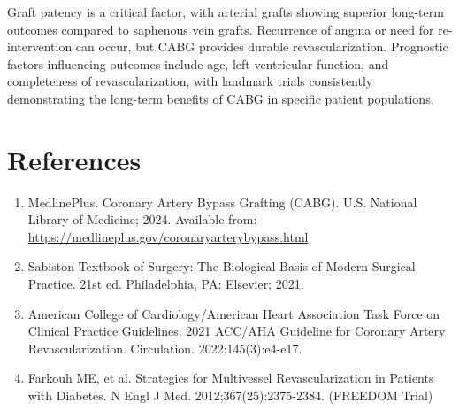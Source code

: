 Graft patency is a critical factor, with arterial grafts showing superior long-term outcomes compared to saphenous vein grafts. Recurrence of angina or need for re-intervention can occur, but CABG provides durable revascularization. Prognostic factors influencing outcomes include age, left ventricular function, and completeness of revascularization, with landmark trials consistently demonstrating the long-term benefits of CABG in specific patient populations.

\section*{References}
\begin{enumerate}
  \item MedlinePlus. Coronary Artery Bypass Grafting (CABG). U.S. National Library of Medicine; 2024. Available from: \url{https://medlineplus.gov/coronaryarterybypass.html}
  
  \item Sabiston Textbook of Surgery: The Biological Basis of Modern Surgical Practice. 21st ed. Philadelphia, PA: Elsevier; 2021.
  
  \item American College of Cardiology/American Heart Association Task Force on Clinical Practice Guidelines. 2021 ACC/AHA Guideline for Coronary Artery Revascularization. Circulation. 2022;145(3):e4-e17.
  
  \item Farkouh ME, et al. Strategies for Multivessel Revascularization in Patients with Diabetes. N Engl J Med. 2012;367(25):2375-2384. (FREEDOM Trial)
\end{enumerate}

\clearpage
